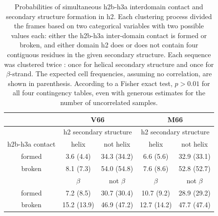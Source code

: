 \documentclass[10pt,letterpaper]{article}
\begin{document}
\begin{table}[!ht]
\centering
\caption{Probabilities of simultaneous h2b-h3a interdomain contact and secondary structure formation in h2. Each clustering process divided the frames based on two categorical variables with two possible values each: either the h2b-h3a inter-domain contact is formed or broken, and either domain h2 does or does not contain four contiguous residues in the given secondary structure. Each sequence was clustered twice : once for helical secondary structure and once for $\beta$-strand. The expected cell frequencies, assuming no correlation, are shown in parenthesis. According to a Fisher exact test, $p > 0.01$ for all four contingency tables, even with generous estimates for the number of uncorrelated samples. 
}
\label{table3}
%
\begin{tabular}{|c|c|c|c|c|}
 \hline
 &    \multicolumn{2}{c|}{V66 } & \multicolumn{2}{c|}{M66 }  \\ 
\hline
 &    \multicolumn{2}{c|}{h2 secondary structure}  & \multicolumn{2}{c|}{h2 secondary structure}   \\ 
\hline
  h2b-h3a contact &     helix   &  not helix   &  helix   &  not helix  \\
\hline
formed & 3.6 (4.4) & 34.3 (34.2) & 6.6 (5.6) & 32.9  (33.1)  \\
\hline
broken & 8.1 (7.3) & 54.0  (54.8) & 7.6  (8.6) & 52.8  (52.7) \\
\hline
\hline
 &   $\beta$     & not $\beta$   & $\beta$    & not $\beta$   \\
\hline
formed &   7.2  (8.5) &   30.7 (30.4) &   10.7 (9.2) &   28.9  (29.2)  \\
\hline
broken&   15.2 (13.9) &   46.9 (47.2)  &   12.7 (14.2) &   47.7 (47.4) \\
\hline
\end{tabular}
\end{table}
\end{document}
